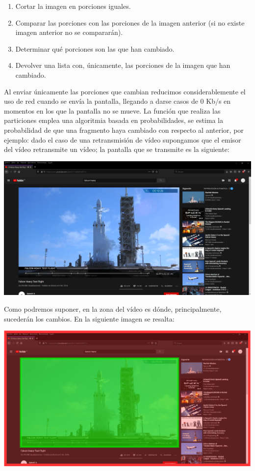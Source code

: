 \documentclass[12pt, a4paper]{book} %
\begin{document}
\begin{itemize}
					\begin{enumerate}
						\item Cortar la imagen en porciones iguales.
						\item Comparar las porciones con las porciones de la imagen anterior (si no existe imagen anterior no se compararán).
						\item Determinar qué porciones son las que han cambiado.
						\item Devolver una lista con, únicamente, las porciones de la imagen que han cambiado.
					\end{enumerate}
					Al enviar únicamente las porciones que cambian reducimos considerablemente el uso de red cuando se envía la pantalla, llegando a darse casos de 0 Kb/s en momentos en los que la pantalla no se mueve. La función que realiza las particiones emplea una algoritmia basada en probabilidades, se estima la probabilidad de que una fragmento haya cambiado con respecto al anterior, por ejemplo: dado el caso de una retransmisión de vídeo supongamos que el emisor del vídeo retransmite un vídeo; la pantalla que se transmite es la siguiente:\\
					\begin{center}
						\includegraphics[width=\textwidth,height=\textheight, keepaspectratio]{img/DrawIO/src/videoemission.PNG}\\
					\end{center}
					Como podremos suponer, en la zona del vídeo es dónde, principalmente, sucederán los cambios. En la siguiente imagen se resalta:\\
					\begin{center}
						\includegraphics[width=\textwidth,height=\textheight, keepaspectratio]{img/VideoEmission.pdf}\\

\end{center}
\end{itemize}
\end{document}
